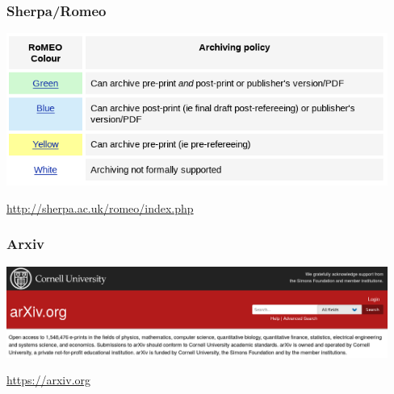 \documentclass[17pt,aspectratio=169]{beamer}
\begin{document}
\begin{frame}
\frametitle{Sherpa/Romeo}

\begin{center}
  \includegraphics[width=12.5cm]{figs/sherpa-romeo}
\end{center}  

\begin{flushright}
{\small \url{http://sherpa.ac.uk/romeo/index.php}}
\end{flushright}

\end{frame}

\begin{frame}
\frametitle{Arxiv}

\begin{center}
  \includegraphics[width=12.5cm]{figs/arxiv}
\end{center}  

\begin{flushright}
{\small \url{https://arxiv.org}}
\end{flushright}

\end{frame}
\end{document}
